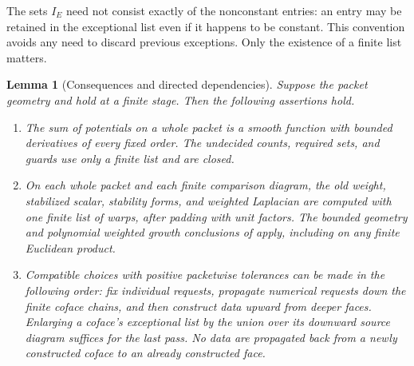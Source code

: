 \documentclass[11pt]{article}
\numberwithin{equation}{section}
\newtheorem{lemma}[theorem]{Lemma}
\theoremstyle{definition}
\theoremstyle{remark}
\begin{document}
The sets $I_E$ need not consist exactly of the nonconstant entries: an
entry may be retained in the exceptional list even if it happens to be
constant. This convention avoids any need to discard previous exceptions.
Only the existence of a finite list matters.

\begin{lemma}[Consequences and directed dependencies]\label{countable:locality}
Suppose the packet geometry and  hold at a
finite stage. Then the following assertions hold.
\begin{enumerate}[label=(\roman*),leftmargin=*]
\item The sum of potentials on a whole packet is a smooth function
with bounded derivatives of every fixed order. The undecided counts,
required sets, and guards use only a finite list and are closed.
\item On each whole packet and each finite comparison diagram, the old
weight, stabilized scalar, stability forms, and weighted Laplacian are
computed with one finite list of warps, after padding with unit factors.
The bounded geometry and polynomial weighted growth conclusions of
 apply, including on any finite Euclidean product.
\item Compatible choices with positive packetwise tolerances can be
made in the following order: fix individual requests, propagate numerical
requests down the finite coface chains, and then construct data upward
from deeper faces. Enlarging a coface's exceptional list by the union
over its downward source diagram suffices for the last pass. No data
are propagated back from a newly constructed coface to an already
constructed face.
\end{enumerate}
\end{lemma}
\end{document}
